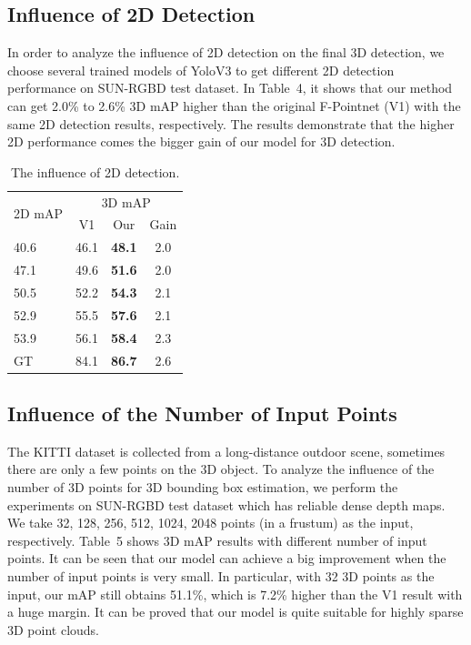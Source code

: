 \documentclass[letterpaper]{article} %
\begin{document}
\subsection{Influence of 2D Detection}

In order to analyze the influence of 2D detection on the final 3D detection, we choose several trained models of YoloV3 to get different 2D detection performance on SUN-RGBD test dataset. In Table~4, it shows that our method can get 2.0\% to 2.6\% 3D mAP higher than the original F-Pointnet (V1) with the same 2D detection results, respectively. The results demonstrate that the higher 2D performance comes the bigger gain of our model for 3D detection.

\begin{table}[h]
\scriptsize
\begin{center}
\begin{tabular} {l|c|c|c}
\hline
\multirow{2}{*}{2D mAP} & \multicolumn{3}{c}{3D mAP} \\
\cline{2-4}& V1 & Our  &Gain\\
\hline
\hline
40.6 		     & 46.1 &\textbf{48.1}   &2.0  \\
47.1 		     & 49.6 &\textbf{51.6}   &2.0  \\
50.5 	         & 52.2 &\textbf{54.3}   &2.1  \\
52.9 	         & 55.5 &\textbf{57.6}   &2.1  \\
53.9 			 & 56.1 &\textbf{58.4}   &2.3  \\
GT			     & 84.1 &\textbf{86.7}   &2.6  \\
\hline
\end{tabular}
\end{center}
\caption{The influence of 2D detection.}
\label{tab:Influence of 2D Detection}
\end{table}

\subsection{Influence of the Number of Input Points}
The KITTI dataset is collected from a long-distance outdoor scene, sometimes there are only a few points on the 3D object. To analyze the influence of the number of 3D points for 3D bounding box estimation, we perform the experiments on SUN-RGBD test dataset which has reliable dense depth maps. We take 32, 128, 256, 512, 1024, 2048 points (in a frustum) as the input, respectively. Table~5 shows 3D mAP results with different number of input points. It can be seen that our model can achieve a big improvement when the number of input points is very small. In particular, with 32 3D points as the input, our mAP still obtains 51.1\%,  which is 7.2\% higher than the V1 result with a huge margin. It can be proved that our model is quite suitable for highly sparse 3D point clouds.
\end{document}
